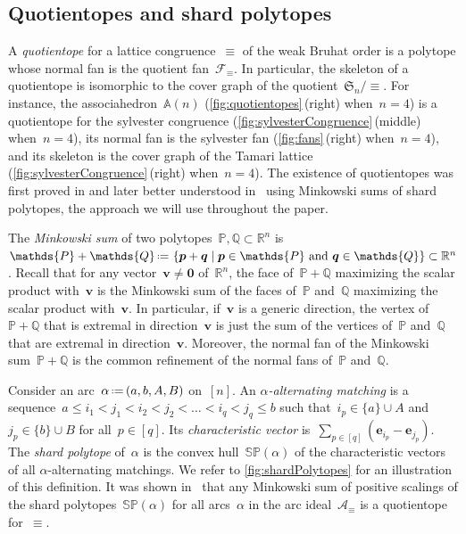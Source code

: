 \documentclass{amsart}
\theoremstyle{definition}
\newcommand{\R}{\mathbb{R}} %
\renewcommand{\c}[1]{\mathcal{#1}} %
\renewcommand{\b}[1]{{\boldsymbol{#1}}} %
\newcommand{\f}[1]{\mathfrak{#1}} %
\newcommand{\set}[2]{\left\{ #1 \;\middle|\; #2 \right\}} %
\newcommand{\eqdef}{\mbox{\,\raisebox{0.2ex}{\scriptsize\ensuremath{\mathrm:}}\ensuremath{=}\,}} %
\newcommand{\darkblue}{\color{darkblue}} %
\newcommand{\defn}[1]{\textsl{\darkblue #1}} %
\newcommand{\polytope}[1]{\mathds{#1}} %
\newcommand{\Asso}{\polytope{A}} %
\newcommand{\SP}{\polytope{SP}}
\begin{document}

\subsection{Quotientopes and shard polytopes}
\label{subsec:quotientopes}

A \defn{quotientope} for a lattice congruence~$\equiv$ of the weak Bruhat order is a polytope whose normal fan is the quotient fan~$\c{F}_\equiv$.
In particular, the skeleton of a quotientope is isomorphic to the cover graph of the quotient~$\f{S}_n/{\equiv}$.
For instance, the associahedron~$\Asso(n)$ (\cref{fig:quotientopes}\,(right) when~$n = 4$) is a quotientope for the sylvester congruence (\cref{fig:sylvesterCongruence}\,(middle) when~$n = 4$), its normal fan is the sylvester fan (\cref{fig:fans}\,(right) when~$n = 4$), and its skeleton is the cover graph of the Tamari lattice (\cref{fig:sylvesterCongruence}\,(right) when~$n = 4$).
The existence of quotientopes was first proved in \cite{MR3964495} and later better understood in~\cite{MR4584712} using Minkowski sums of shard polytopes, the approach we will use throughout the paper.

The \defn{Minkowski sum} of two polytopes~$\polytope{P}, \polytope{Q} \subset \R^n$ is~$\polytope{P} + \polytope{Q} \eqdef \set{\b{p} + \b{q}}{\b{p} \in \polytope{P} \text{ and } \b{q} \in \polytope{Q}} \subset \R^n$.
Recall that for any vector~$\b{v} \ne \b{0}$ of~$\R^n$, the face of~$\polytope{P} + \polytope{Q}$ maximizing the scalar product with~$\b{v}$ is the Minkowski sum of the faces of~$\polytope{P}$ and~$\polytope{Q}$ maximizing the scalar product with~$\b{v}$.
In particular, if~$\b{v}$ is a generic direction, the vertex of~$\polytope{P} + \polytope{Q}$ that is extremal in direction~$\b{v}$ is just the sum of the vertices of~$\polytope{P}$ and~$\polytope{Q}$ that are extremal in direction~$\b{v}$.
Moreover, the normal fan of the Minkowski sum~$\polytope{P} + \polytope{Q}$ is the common refinement of the normal fans of~$\polytope{P}$ and~$\polytope{Q}$.

Consider an arc~$\alpha \eqdef (a, b, A, B)$ on~$[n]$.
An \defn{$\alpha$-alternating matching} is a sequence~$a \le i_1 < j_1 < i_2 < j_2 < \dots < i_q < j_q \le b$ such that~$i_p \in \{a\} \cup A$ and~$j_p \in \{b\} \cup B$ for all~$p \in [q]$.
Its \defn{characteristic vector} is~$\sum_{p \in [q]} (\b{e}_{i_p} - \b{e}_{j_p})$.
The \defn{shard polytope} of~$\alpha$ is the convex hull~$\SP(\alpha)$ of the characteristic vectors of all $\alpha$-alternating matchings.
We refer to \cref{fig:shardPolytopes} for an illustration of this definition.
It was shown in~\cite{MR4584712} that any Minkowski sum of positive scalings of the shard polytopes~$\SP(\alpha)$ for all arcs~$\alpha$ in the arc ideal~$\c{A}_\equiv$ is a quotientope for~$\equiv$.
\end{document}
